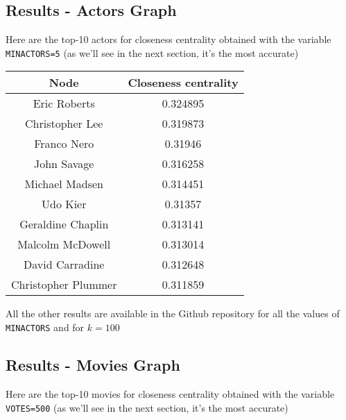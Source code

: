 \subsection{Results - Actors Graph}

Here are the top-10 actors for closeness centrality obtained with the variable \texttt{MIN\textunderscore ACTORS=5} (as we'll see in the next section, it's the most accurate)

\begin{table}[h!]
    \centering
     \begin{tabular}{||c c||}
     \hline
     Node & Closeness centrality \\ [0.5ex]
     \hline\hline
     Eric Roberts & 0.324895 \\
     Christopher Lee &0.319873 \\
     Franco Nero & 0.31946 \\
     John Savage & 0.316258 \\
     Michael Madsen & 0.314451 \\
     Udo Kier & 0.31357 \\
     Geraldine Chaplin & 0.313141 \\
     Malcolm McDowell & 0.313014 \\
     David Carradine & 0.312648 \\
     Christopher Plummer & 0.311859 \\ [1ex]
     \hline
     \end{tabular}
\end{table}

\nd All the other results are available in the Github repository for all the values of \texttt{MIN\textunderscore ACTORS} and for $k=100$

\newpage
\subsection{Results - Movies Graph}

Here are the top-10 movies for closeness centrality obtained with the variable \texttt{VOTES=500} (as we'll see in the next section, it's the most accurate)

